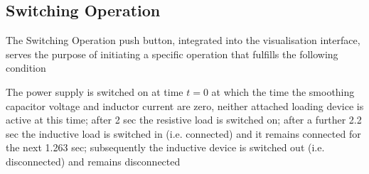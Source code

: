 \pagebreak
\subsection{Switching Operation} \label{section:switchingOperation}
The Switching Operation push button, integrated into the visualisation interface, serves the purpose of initiating a specific operation that fulfills the following condition
\begin{shquote}
The power supply is switched on at time $t=0$ at which the time the smoothing capacitor voltage and inductor current are zero, neither attached loading device is active at this time; after 2 sec the resistive load is switched on; after a further 2.2 sec the inductive load is switched in (i.e. connected) and it remains connected for the next 1.263 sec; subsequently the inductive device is switched out (i.e. disconnected) and remains disconnected
\end{shquote}

